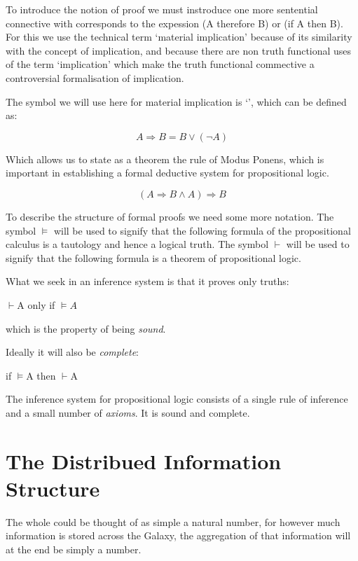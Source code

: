 \documentclass[10pt,titlepage]{article}
\begin{document}
To introduce the notion of proof we must instroduce one more sentential connective with corresponds to the expession (A therefore B) or (if A then B).
For this we use the technical term `material implication' because of its similarity with the concept of implication, and because there are non truth functional uses of the term `implication' which make the truth functional commective a controversial formalisation of implication.

The symbol we will use here for material implication is `\Rightarrow{}', which can be defined as:


\[ A \Rightarrow{} B = B \lor{} (\lnot{} A)\]

Which allows us to state as a theorem the rule of Modus Ponens, which is important in establishing a formal deductive system for propositional logic.


\[ (A \Rightarrow{} B \land{} A)  \Rightarrow{} B\]

To describe the structure of formal proofs we need some more notation.
The symbol $\vDash{}$ will be used to signify that the following formula of the propositional calculus is a tautology and hence a logical truth.
The symbol  $\vdash{}$ will be used to signify that the following formula is a theorem of propositional logic.

What we seek in an inference system is that it proves only truths:

\begin{center}
  $\vdash{}$A only if $\vDash{}A$
  \end{center}

which is the property of being \emph{sound}.

Ideally it will also be \emph{complete}:

\begin{center}
  if $\vDash{}$A then $\vdash{}$A
\end{center}

The inference system for propositional logic consists of a single rule of inference and a small number of \emph{axioms}.
It is sound and complete.


\section{The Distribued Information Structure}

The whole could be thought of as simple a natural number, for however much information is stored across the Galaxy, the aggregation of that information will at the end be simply a number.
\end{document}
